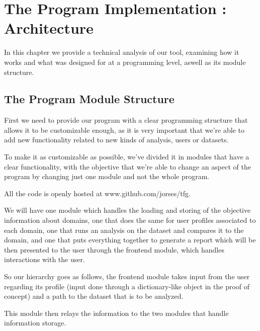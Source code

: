 %
%

\chapter{The Program Implementation : Architecture}


\begin{resumen}
In this chapter we provide a technical analysis of our tool, examining how it works and what was designed for at a programming level, aswell as its module structure.
\end{resumen}

\linespread{1.6}

\section{The Program Module Structure}

First we need to provide our program with a clear programming structure that allows it to be customizable enough, as it is very important that we're able to add new functionality related to new kinds of analysis, users or datasets.

To make it as customizable as possible, we've divided it in modules that have a clear functionality, with the objective that we're able to change an aspect of the program by changing just one module and not the whole program.

All the code is openly hosted at www.github.com/jorses/tfg.

We will have one module which handles the loading and storing of the objective information about domains, one that does the same for user profiles associated to each domain, one that runs an analysis on the dataset and compares it to the domain, and one that puts everything together to generate a report which will be then presented to the user through the frontend module, which handles interactions with the user.

So our hierarchy goes as follows, the frontend module takes input from the user regarding its profile (input done through a dictionary-like object in the proof of concept) and a path to the dataset that is to be analyzed.

This module then relays the information to the two modules that handle information storage. 

